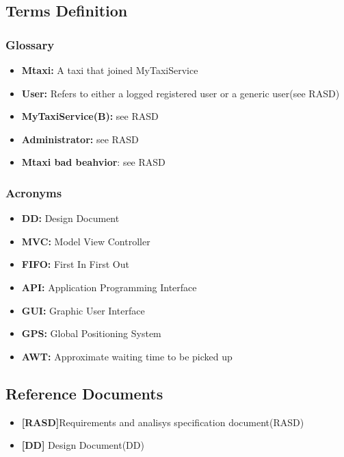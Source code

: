 \documentclass[11pt,titlepage]{article} %
\begin{document}
\subsection{Terms Definition}
  \subsubsection{Glossary}
    \begin{itemize}
      \item \textbf{Mtaxi:} A taxi that joined MyTaxiService
      \item \textbf{User:} Refers to either a logged registered user or a generic user(see RASD)
      \item \textbf{MyTaxiService(B):} see RASD
      \item \textbf{Administrator:} see RASD
      \item \textbf{Mtaxi bad beahvior}: see RASD
    \end{itemize}
   
  \subsubsection{Acronyms}
    \begin{itemize}
      \item \textbf{DD:} Design Document
      \item \textbf{MVC:} Model View Controller
      \item \textbf{FIFO:} First In First Out
      \item \textbf{API:} Application Programming Interface
      \item \textbf{GUI:} Graphic User Interface
      \item \textbf{GPS:} Global Positioning System
      \item \textbf{AWT:} Approximate waiting time to be picked up
     \end{itemize}

\subsection{Reference Documents}
  \begin{itemize}
   \item \textbf{[RASD]}Requirements and analisys specification document(RASD)
   \item \textbf{[DD]} Design Document(DD)
  \end{itemize}

\newpage
\end{document}
